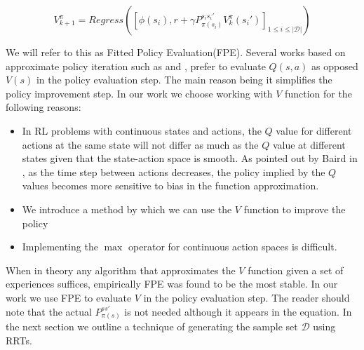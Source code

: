 \documentclass[wcp]{jmlr}
\begin{document}
\begin{equation}\label{eq:fpe}
V^\pi _{k+1} = Regress\left( \left[ \phi(s_i), r+\gamma P^{s_is_i'}_{\pi(s_i)}V^\pi _k(s_i') \right]_{1 \leq i \leq \vert \mathcal{D}\vert} \right)
\end{equation} 

We will refer to this as Fitted Policy Evaluation(FPE). Several works based on approximate policy iteration such as \citep{rmaxlspi} and \citep{lspi}, prefer to evaluate $Q(s,a)$ as opposed $V(s)$ in the policy evaluation step. The main reason being it simplifies the policy improvement step. In our work we choose working with $V$ function for the following reasons:

\begin{itemize}
	\item In RL problems with continuous states and actions, the $Q$ value for different actions at the same state will not differ as much as the $Q$ value at different states given that the state-action space is smooth. As pointed out by Baird in \citep{bairdadvantage} , as the time step between actions decreases, the policy implied by the $Q$ values becomes more sensitive to bias in the function approximation.
	\item We introduce a method by which we can use the $V$ function to improve the policy
	\item Implementing the $\max$ operator for continuous action spaces is difficult.
\end{itemize}

When in theory any algorithm that approximates the $V$ function given a set of experiences suffices, empirically FPE was found to be the most stable. In our work we use FPE to evaluate $V$ in the policy evaluation step. The reader should note that the actual $P^{ss'}_{\pi(s)}$ is not needed although it appears in the equation. In the next section we outline a technique of generating the sample set $ \mathcal{D}$ using RRTs.
\end{document}
